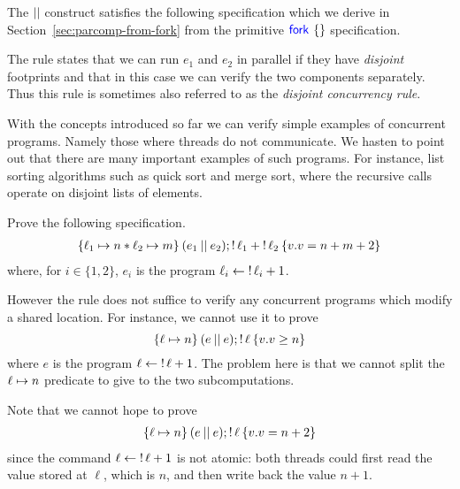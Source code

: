 The $\mathbin{||}$ construct satisfies the following specification which we derive in Section~\ref{sec:parcomp-from-fork} from the primitive $\Fork{}$ specification.
The rule states that we can run $e_1$ and $e_2$ in parallel if they 
have \emph{disjoint} footprints and that in this case
we can verify the two components separately. 
Thus this rule is sometimes also referred to as the \emph{disjoint
  concurrency rule}. 

With the concepts introduced so far we can verify simple examples of
concurrent programs.  Namely those where threads do not communicate.
We hasten to point out that there are many important examples of such
programs.  For instance, list sorting algorithms such as quick sort and
merge sort, where the recursive calls operate on disjoint lists of
elements. 

\begin{exercise}
  Prove the following specification.
  \begin{align*}
    \hoare{\ell_1 \pointsto n \ast \ell_2 \pointsto m}{(e_1 \parcomp e_2) ; \deref \ell_1 + \deref \ell_2}{v.v=n + m + 2}
  \end{align*}
  where, for $i \in \{1,2\}$, $e_i$ is the program $\ell_i \leftarrow \mathop{!} \ell_i + 1$.
\end{exercise}

However the  rule does not suffice
to verify any concurrent programs which modify a shared location.
For instance, we cannot use it to prove
\begin{equation}
  \label{eq:proving-parallel-increments-dont-decrease}
  \hoare{\ell \pointsto n}{(e \parcomp e) ; \deref \ell}{v.v \geq n}
\end{equation}
where $e$ is the program $\ell \leftarrow \mathop{!}\ell + 1$.
The problem here is that we cannot split 
the $\ell \mapsto n$ predicate to give to the two subcomputations.

Note that we cannot hope to prove
\begin{align*}
  \hoare{\ell \pointsto n}{(e \parcomp e) ; \deref \ell}{v.v = n + 2}
\end{align*}
since the command $\ell \leftarrow \mathop{!}\ell + 1$ is not atomic:
both threads could first read the value stored at $\ell$, 
which is $n$, and then write back the value $n + 1$.


